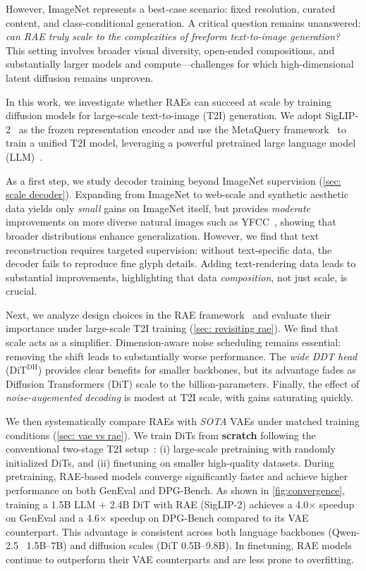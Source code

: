 \documentclass[10pt,twocolumn,letterpaper]{article}
\newcommand{\DDT}{$\text{DiT}^{\text{DH}}$\xspace} %
\begin{document}
However, ImageNet represents a best-case scenario: fixed resolution, curated content, and class-conditional generation.
A critical question remains unanswered: \emph{can RAE truly scale to the complexities of freeform text-to-image generation?}
This setting involves broader visual diversity, open-ended compositions, and substantially larger models and compute---challenges for which high-dimensional latent diffusion remains unproven.

In this work, we investigate whether RAEs can succeed at scale by training diffusion models for large-scale text-to-image (T2I) generation. We adopt SigLIP-2~\citep{tschannen2025siglip} as the frozen representation encoder and use the MetaQuery framework~\citep{metaquery} to train a unified T2I model, leveraging a powerful pretrained large language model (LLM)~\citep{qwen2024qwen2}.

As a first step, we study decoder training beyond ImageNet supervision (\cref{sec: scale decoder}). Expanding from ImageNet to web-scale and synthetic aesthetic data yields only \textit{small} gains on ImageNet itself, but provides \textit{moderate} improvements on more diverse natural images such as YFCC~\citep{thomee2016yfcc100m}, showing that broader distributions enhance generalization. However, we find that text reconstruction requires targeted supervision: without text-specific data, the decoder fails to reproduce fine glyph details. Adding text-rendering data leads to substantial improvements, highlighting that data \emph{composition}, not just scale, is crucial.


Next, we analyze design choices in the RAE framework~\citep{zheng2025diffusion} and evaluate their importance under large-scale T2I training (\cref{sec: revisiting rae}).  We find that scale acts as a simplifier.
Dimension-aware noise scheduling remains essential: removing the shift leads to substantially worse performance. The \emph{wide DDT head} (\DDT{}) provides clear benefits for smaller backbones, but its advantage fades as Diffusion Transformers (DiT) scale to the billion-parameters.
Finally, the effect of \emph{noise-augemented decoding} is modest at T2I scale, with gains saturating quickly.






We then systematically compare RAEs with \emph{SOTA} VAEs under matched training conditions (\cref{sec: vae vs rae}).
We train DiTs from \textbf{scratch} following the conventional two-stage T2I setup~\citep{dai2023emu,podell2023sdxl}:
(i) large-scale pretraining with randomly initialized DiTs, and
(ii) finetuning on smaller high-quality datasets.
During pretraining, RAE-based models converge significantly faster and achieve higher performance on both GenEval and DPG-Bench.
As shown in \cref{fig:convergence}, training a 1.5B LLM + 2.4B DiT with RAE (SigLIP-2) achieves a 4.0× speedup on GenEval and a 4.6× speedup on DPG-Bench compared to its VAE counterpart.
This advantage is consistent across both language backbones (Qwen-2.5~\cite{qwen} 1.5B--7B) and diffusion scales (DiT 0.5B--9.8B).
In finetuning, RAE models continue to outperform their VAE counterparts and are less prone to overfitting. 
\end{document}
